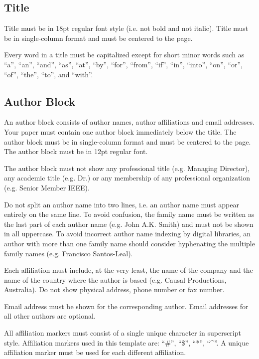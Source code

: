 \documentclass[conference,10pt,letterpaper]{IEEEtran}%
\begin{document}
\subsection{Title}
\label{sec:title}

Title must be in 18pt regular font style (i.e. not bold and not
italic). Title must be in single-column format and must be centered to
the page.

Every word in a title must be capitalized except for short minor words
such as ``a'', ``an'', ``and'', ``as'', ``at'', ``by'', ``for'', ``from'', ``if'', ``in'',
``into'', ``on'', ``or'', ``of'', ``the'', ``to'', and ``with''.


\subsection{Author Block}
\label{sec:author}

An author block consists of author names, author affiliations and
email addresses. Your paper must contain one author block immediately
below the title. The author block must be in single-column format and
must be centered to the page. The author block must be in 12pt
regular font.

The author block must not show any professional title (e.g. Managing
Director), any academic title (e.g. Dr.) or any membership of any
professional organization (e.g. Senior Member IEEE).

Do not split an author name into two lines, i.e. an author name must
appear entirely on the same line. To avoid confusion, the family name
must be written as the last part of each author name (e.g. John A.K.
Smith) and must not be shown in all uppercase. To avoid incorrect
author name indexing by digital libraries, an author with more than
one family name should consider hyphenating the multiple family names
(e.g. Francisco Santos-Leal).

Each affiliation must include, at the very least, the name of the
company and the name of the country where the author is based (e.g.
Causal Productions, Australia). Do not show physical address, phone
number or fax number.

Email address must be shown for the corresponding author. Email
addresses for all other authors are optional.

All affiliation markers must consist of a single unique character in
superscript style. Affiliation markers used in this template are: ``\#'',
``\$'', ``*'', ``\textasciicircum''. A unique affiliation marker must
be used for each different affiliation.
\end{document}
